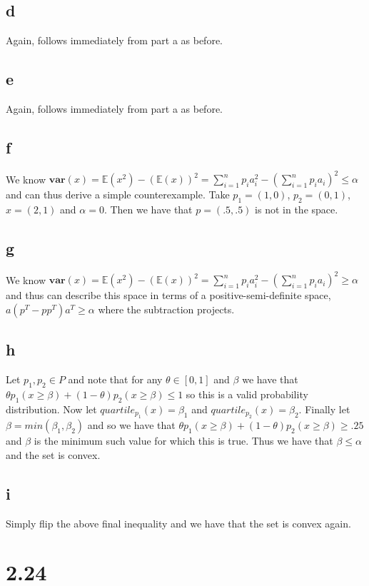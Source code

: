\documentclass{article}
\begin{document}
\subsection*{d}
Again, follows immediately from part a as before.
\subsection*{e}
Again, follows immediately from part a as before.
\subsection*{f}
We know $\textbf{var} (x) = \mathbb{E}(x^2) - (\mathbb{E}(x))^2 = \sum_{i=1}^{n} p_i a_i ^ 2 - (\sum_{i=1}^{n} p_i a_i)^2 \leq \alpha$ and can thus derive a simple counterexample.  Take $p_1 = (1,0)$, $p_2 = (0,1)$, $x = (2,1)$ and $\alpha = 0$.  Then we have that $p = (.5, .5)$ is not in the space.
\subsection*{g}
We know $\textbf{var} (x) = \mathbb{E}(x^2) - (\mathbb{E}(x))^2 = \sum_{i=1}^{n} p_i a_i ^ 2 - (\sum_{i=1}^{n} p_i a_i)^2 \geq \alpha$ and thus can describe this space in terms of a positive-semi-definite space, $a(p^T - p p^T)a^T \geq \alpha$ where the subtraction projects.
\subsection*{h}
Let $p_1, p_2 \in P$ and note that for any $\theta \in [0,1]$ and $\beta$ we have that $\theta p_1(x \geq \beta) + (1-\theta) p_2(x \geq \beta) \leq 1$ so this is a valid probability distribution.  Now let $quartile_{p_1}(x) = \beta_1$ and $quartile_{p_2}(x) = \beta_2$.  Finally let $\beta = min(\beta_1, \beta_2)$ and so we have that $\theta p_1(x \geq \beta) + (1-\theta) p_2(x \geq \beta) \geq .25$ and $\beta$ is the minimum such value for which this is true.  Thus we have that $\beta \leq \alpha$ and the set is convex.
\subsection*{i}
Simply flip the above final inequality and we have that the set is convex again.
\section*{2.24}
\end{document}

